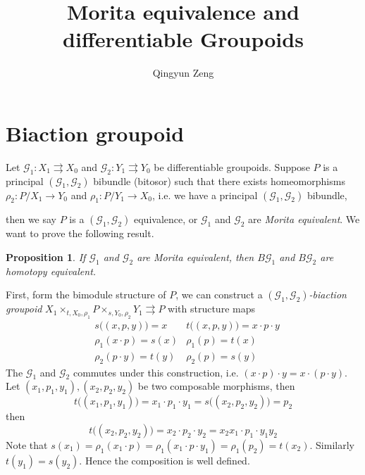 \documentclass[12pt]{amsart}
\newtheorem{prop}[thm]{Proposition}
\theoremstyle{definition}
\theoremstyle{remark}
\numberwithin{equation}{section}
\newcommand{\CG}{{\mathcal G}}
\begin{document}
	\author{Qingyun Zeng}
\title{Morita equivalence and differentiable Groupoids }


\maketitle
\tableofcontents	
\section{Biaction groupoid}

Let $\CG_1: X_1 \rightrightarrows X_0$ and $\CG_2: Y_1 \rightrightarrows Y_0$ be differentiable groupoids.
Suppose $P$ is  a principal $(\CG_1,\CG_2)$ bibundle (bitosor) such that there exists homeomorphisms $\rho_2: P/X_1\to Y_0$ and $\rho_1: P/Y_1 \to X_0$, i.e. we have a principal $(\CG_1,\CG_2)$ bibundle,

	\begin{center}
\end{center}
then we say $P$ is a $(\CG_1,\CG_2)$ equivalence, or $\CG_1$ and $\CG_2$ are {\it Morita equivalent}. We want to prove the following result.

\begin{prop}
	If $\CG_1$ and $\CG_2$ are Morita equivalent, then $B\CG_1$ and $B\CG_2$ are homotopy equivalent.
\end{prop}
First, form the bimodule structure of $P$, we can construct a {\it $(\CG_1,\CG_2)$-biaction groupoid} $ X_1\times_{t,X_0,\rho_1} P\times_{s,Y_0,\rho_2}Y_1\rightrightarrows P$ with structure maps
\begin{align*}
&s\big((x, p, y)\big)=x &t\big((x, p, y)\big)=x\cdot p\cdot y\\
&\rho_1(x\cdot p)=s(x)  &\rho_1( p)=t(x) \\
&\rho_2(p\cdot y)=t(y)  &\rho_2(p)=s(y)
\end{align*}
The $\CG_1$ and $\CG_2$ commutes under this construction, i.e. $(x\cdot p)\cdot y=x\cdot (p\cdot y)$. Let $(x_1,p_1,y_1), (x_2,p_2,y_2)$ be two composable morphisms, then 
\begin{equation*}
t\big((x_1, p_1, y_1)\big)=x_1\cdot p_1\cdot y_1=s\big((x_2, p_2, y_2)\big)=p_2
\end{equation*}
then 
\begin{equation*}
t\big((x_2, p_2, y_2)\big)=x_2\cdot p_2\cdot y_2=x_2 x_1\cdot p_1\cdot y_1 y_2
\end{equation*}
Note that $s(x_1)=\rho_1(x_1\cdot p)=\rho_1(x_1\cdot p \cdot y_1)=\rho_1(p_2)=t(x_2)$. Similarly $t(y_1)=s(y_2)$. Hence the composition is well defined.
\end{document}
